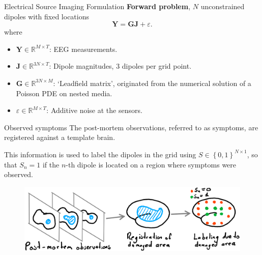 \documentclass[progressbar=head]{beamer}
\newcommand{\set}[1]{ \left\{ #1 \right\} }
\newcommand{\J}{\mathbf{J}}
\newcommand{\Y}{\mathbf{Y}}
\newcommand{\G}{\mathbf{G}}
\newcommand{\R}{\mathbb{R}}
\begin{document}
\begin{frame}{Electrical Source Imaging Formulation}
\textbf{Forward problem}, $N$ unconstrained dipoles with fixed locations
\begin{equation}
\Y = \G \J + \varepsilon.
\end{equation}
where
\begin{itemize}
\item $\Y \in \R^{M \times T}$: EEG measurements.
\item $\J \in \R^{3N \times T}$: Dipole magnitudes, 3 dipoles per grid point.
\item $\G \in \R^{3N\times M}$: `Leadfield matrix', originated from the numerical solution of a Poisson PDE on  nested media.
\item $\varepsilon\in \R^{M\times T}$: Additive noise at the sensors.
\end{itemize}
\end{frame}

\begin{frame}{Observed symptoms}
The post-mortem observations, referred to as \alert{symptoms}, are registered against a template brain. 

This information is used to label the dipoles in the grid using
${S\in \set{0,1}^{N\times 1}}$, so that $S_n = 1$ if the $n$-th dipole is located on a region where symptoms were observed.

\begin{figure}
\centering
\includegraphics[width=0.8\linewidth]{./img_oldbeamer/sketch02_v2}
\end{figure}

\end{frame}
\end{document}
